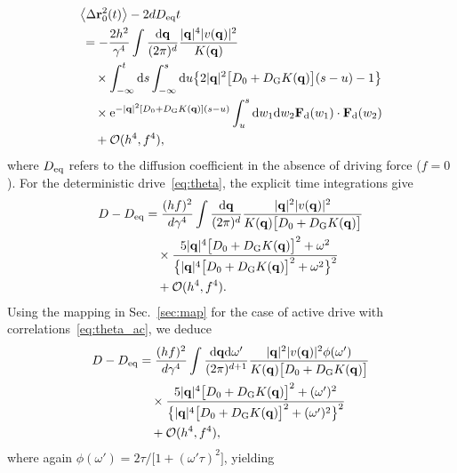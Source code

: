 \documentclass[superscriptaddress, twocolumn, prx, longbibliography, nofootinbib]{revtex4-1}
\begin{document}
\begin{equation}
	\begin{aligned}
		&\big\langle\Delta{\bf r}^2_0(t)\big\rangle - 2 d D_{\rm eq} t
		\\
		&\,= - \frac{2h^2}{\gamma^4} \int \frac{{\rm d}{\bf q}}{(2\pi)^d} \frac{|{\bf q}|^4 |v({\bf q})|^2}{K({\bf q})}
		\\
		&\,\quad\times \int_{-\infty}^t{\rm d}s \int_{-\infty}^s{\rm d}u \big\{ 2|{\bf q}|^2\big[D_0+D_{\rm G}K({\bf q})\big](s-u) - 1\big\}
		\\
		&\,\quad\times {\rm e}^{ -|{\bf q}|^2[D_0+D_{\rm G}K({\bf q})](s-u)} \int_u^s {\rm d}w_1{\rm d}w_2 {\bf F}_{\rm d}(w_1)\cdot{\bf F}_{\rm d}(w_2)
		\\
		&\,\quad + {\cal O}(h^4,f^4) ,
	\end{aligned}
\end{equation}
where $D_{\rm eq}$ refers to the diffusion coefficient in the absence of driving force ($f=0$). For the deterministic drive~\eqref{eq:theta}, the explicit time integrations give
\begin{equation}
	\begin{aligned}
		D - D_{\rm eq} &= \frac{(hf)^2}{d\gamma^4} \int \frac{{\rm d}{\bf q}}{(2\pi)^d} \frac{|{\bf q}|^2|v({\bf q})|^2}{K({\bf q})\big[D_0+D_{\rm G}K({\bf q})\big]}
		\\
		&\quad\times \frac{5|{\bf q}|^4\big[D_0+D_{\rm G}K({\bf q})\big]^2 + \omega^2}{ \big\{ |{\bf q}|^4\big[D_0+D_{\rm G}K({\bf q})\big]^2 + \omega^2 \big\}^2}
		\\
		&\quad + {\cal O}(h^4,f^4) .
	\end{aligned}
\end{equation}
Using the mapping in Sec.~\ref{sec:map} for the case of active drive with correlations~\eqref{eq:theta_ac}, we deduce
\begin{equation}
	\begin{aligned}
		D - D_{\rm eq} &= \frac{(hf)^2}{d\gamma^4} \int \frac{{\rm d}{\bf q}{\rm d}\omega'}{(2\pi)^{d+1}} \frac{|{\bf q}|^2|v({\bf q})|^2\phi(\omega')}{K({\bf q})\big[D_0+D_{\rm G}K({\bf q})\big]}
		\\
		&\quad\times \frac{5|{\bf q}|^4\big[D_0+D_{\rm G}K({\bf q})\big]^2 + (\omega')^2}{ \big\{ |{\bf q}|^4\big[D_0+D_{\rm G}K({\bf q})\big]^2 + (\omega')^2 \big\}^2}
		\\
		&\quad + {\cal O}(h^4,f^4) ,
	\end{aligned}
\end{equation}
where again $\phi(\omega') = 2\tau/\big[1+(\omega'\tau)^2\big]$, yielding
\end{document}
